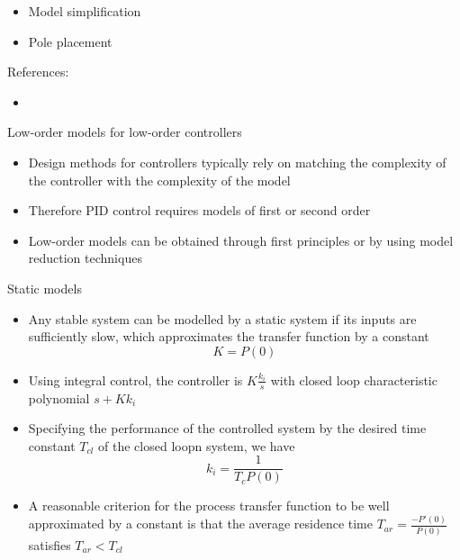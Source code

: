 \documentclass{beamer-control}
\begin{document}

\begin{SUMMARY}
\begin{itemize}
\item Model simplification
\item Pole placement
\end{itemize}
\vfill References:
\begin{itemize}
\item {}
\end{itemize}
\end{SUMMARY}




\begin{frame}{Low-order models for low-order controllers}
\begin{itemize}
\item Design methods for controllers typically rely on matching the complexity of the controller with the complexity of the model
\item Therefore PID control requires models of first or second order
\item Low-order models can be obtained through first principles or by using model reduction techniques
\end{itemize}
\end{frame}

\begin{frame}{Static models}
\begin{itemize}
	\item Any stable system can be modelled by a static system if its inputs are sufficiently slow, which approximates the transfer function by a constant 
	\[K=P(0)\]
	\item Using integral control, the controller is $K\tfrac{k_i}{s}$ with closed loop characteristic polynomial $s+Kk_i$
	\item Specifying the performance of the controlled system by the desired time constant $T_{cl}$ of the closed loopn system, we have
	\[k_i = \frac{1}{T_c P(0)}\]
	\item A reasonable criterion for the process transfer function to be well approximated by a constant is that the average residence time $T_{ar}=\tfrac{-P'(0)}{P(0)}$ satisfies $T_{ar}<T_{cl}$
\end{itemize}
\end{frame}
\end{document}
